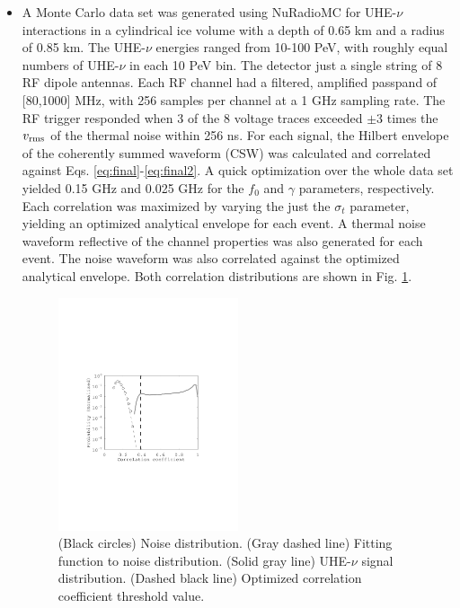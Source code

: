 \documentclass[amsmath,amssymb,aps,prd,10pt,twocolumn,showkeys]{revtex4}
\begin{document}
\begin{itemize}
\item A Monte Carlo data set was generated using NuRadioMC for UHE-$\nu$ interactions in a cylindrical ice volume with a depth of 0.65 km and a radius of 0.85 km.  The UHE-$\nu$ energies ranged from 10-100 PeV, with roughly equal numbers of UHE-$\nu$ in each 10 PeV bin.  The detector just a single string of 8 RF dipole antennas.  Each RF channel had a filtered, amplified passpand of [80,1000] MHz, with 256 samples per channel at a 1 GHz sampling rate.  The RF trigger responded when 3 of the 8 voltage traces exceeded $\pm 3$ times the $v_{\rm rms}$ of the thermal noise within 256 ns.  For each signal, the Hilbert envelope of the coherently summed waveform (CSW) was calculated and correlated against Eqs. \ref{eq:final}-\ref{eq:final2}.  A quick optimization over the whole data set yielded 0.15 GHz and 0.025 GHz for the $f_0$ and $\gamma$ parameters, respectively.  Each correlation was maximized by varying the just the $\sigma_t$ parameter, yielding an optimized analytical envelope for each event.  A thermal noise waveform reflective of the channel properties was also generated for each event.  The noise waveform was also correlated against the optimized analytical envelope.  Both correlation distributions are shown in Fig. \ref{fig:fig3}.

\begin{figure}
\centering
\includegraphics[width=0.5\textwidth,trim=3.25cm 8.25cm 4.5cm 9.0cm,clip=true]{Aug15_plot1.pdf}
\caption{\label{fig:fig3} (Black circles) Noise distribution. (Gray dashed line) Fitting function to noise distribution.  (Solid gray line) UHE-$\nu$ signal distribution.  (Dashed black line) Optimized correlation coefficient threshold value.}
\end{figure}


\end{itemize}
\end{document}

